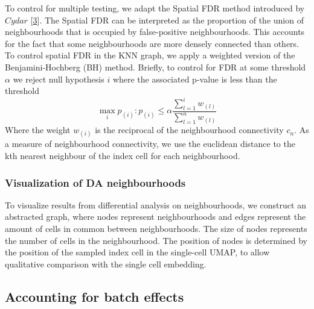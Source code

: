 \documentclass[
]{article}
\begin{document}
To control for multiple testing, we adapt the Spatial FDR method introduced by \(Cydar\) {[}\protect\hyperlink{ref-lunTestingDifferentialAbundance2017}{3}{]}. The Spatial FDR can be interpreted as the proportion of the union of neighbourhoods that is occupied by false-positive neighbourhoods. This accounts for the fact that some neighbourhoods are more densely connected than others. To control spatial FDR in the KNN graph, we apply a weighted version of the Benjamini-Hochberg (BH) method. Briefly, to control for FDR at some threshold \(\alpha\) we reject null hypothesis \(i\) where the associated p-value is less than the threshold
\[
\max_i{p_{(i)}: p_{(i)}\le \alpha\frac{\sum_{l=1}^{i}w_{(l)}}{\sum_{l=1}^{n}w_{(l)}}}
\]
Where the weight \(w_{(i)}\) is the reciprocal of the neighbourhood connectivity \(c_n\). As a measure of neighbourhood connectivity, we use the euclidean distance to the kth nearest neighbour of the index cell for each neighbourhood.

\hypertarget{visualization-of-da-neighbourhoods}{%
\subsubsection{Visualization of DA neighbourhoods}\label{visualization-of-da-neighbourhoods}}

To visualize results from differential analysis on neighbourhoods, we construct an abstracted graph, where nodes represent neighbourhoods and edges represent the amount of cells in common between neighbourhoods. The size of nodes represents the number of cells in the neighbourhood. The position of nodes is determined by the position of the sampled index cell in the single-cell UMAP, to allow qualitative comparison with the single cell embedding.

\hypertarget{accounting-for-batch-effects}{%
\subsection{Accounting for batch effects}\label{accounting-for-batch-effects}}
\end{document}
